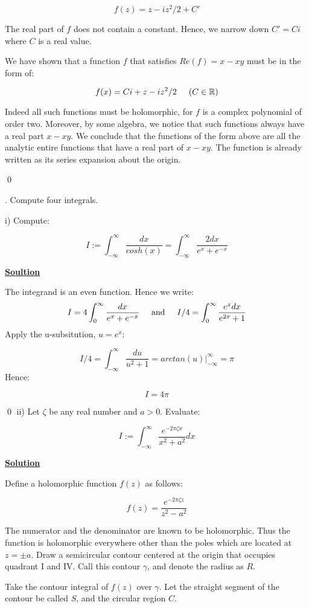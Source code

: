\documentclass{article}
\newcommand{\new}[1]{
    \vspace{2mm}
    \noindent
    \textbf{
    \underline{#1}}
}
\newcounter{problemcnt}
\newcommand{\Problem}{{
    \vspace{5mm}
    \stepcounter{problemcnt}
    \noindent
    \arabic{problemcnt}. 
}
}
\newcommand{\textAnd}{
    {
        \hspace{5mm}
        \textrm{and}
        \hspace{5mm}
    }
}
\begin{document}
\[
    f(z) = z-iz^2/2+C'
\]

The real part of $f$ does not contain a constant. Hence, we narrow 
down $C' = Ci$ where $C$ is a real value. 

We have shown that a function 
$f$ that satisfies $Re(f) = x-xy$ must be in the form of:

\[
    f(x) = Ci + z-iz^2/2\hspace{5mm} (C \in \mathbb{R})
\]

Indeed all such functions must be holomorphic, for $f$ is 
a complex polynomial of order two. Moreover, by some algebra, 
we notice that such functions always have a real part $x-xy$. 
We conclude that the functions of the form above are all the 
analytic entire 
functions that have a real part of $x - xy$. The function 
is already written as its series expansion about the origin. 

\qed

\newpage
\Problem Compute four integrals. 


i) Compute:

\[
    I := \int_{-\infty}^\infty 
    \frac{dx}{cosh(x)}
     = \int_{-\infty}^{\infty}
    \frac{2dx}{e^x+e^{-x}}
\]

\new{Soultion}
The integrand is an even function. Hence we write:
\[
    I = 4\int_0^\infty \frac{dx}{e^x+e^{-x}}
    \textAnd 
    I/4 = \int_{0}^\infty \frac{e^xdx}{e^{2x}+1}
\]
Apply the u-subsitution, $u = e^x$:

\[
    I/4 = \int^\infty_{-\infty}
    \frac{du}{u^2+1}
    =arctan(u)\bigg|^\infty_{-\infty}
    =\pi
\]
Hence:

\[
    I = 4\pi
\]

\qed
\newpage
ii) Let $\zeta$ be any real number and $a > 0$. Evaluate:

\[
    I:=
    \int_{-\infty}^\infty 
    \frac{e^{-2\pi \zeta x}}
    {x^2 + a^2}
    dx
\]

\new{Solution}
Define a holomorphic function $f(z)$ as follows:

\[
    f(z) = \frac{e^{-2\pi \zeta z}}{z^2 - a^2}
\]

The numerator and the denominator are known to be holomorphic. Thus 
the function is holomorphic everywhere other than the poles which are 
located at $z = \pm a$. Draw a semicircular contour centered 
at the origin that occupies quadrant I and IV. Call this 
contour $\gamma$, and denote the radius as $R$. 

Take the contour integral of $f(z)$ over $\gamma$. Let the 
straight segment of the contour be called $S$, and the circular 
region $C$. 
\end{document}
